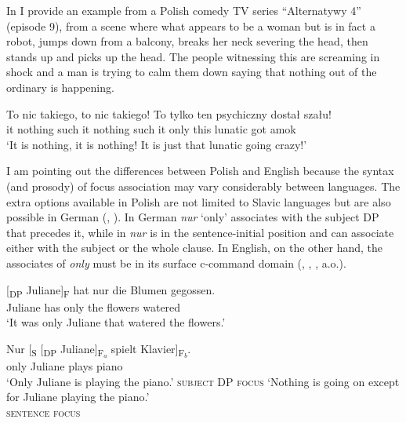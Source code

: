 \documentclass[output=paper,colorlinks,citecolor=brown]{langscibook}
\begin{document}
In  I provide an example from a Polish comedy TV series ``Alternatywy 4'' (episode 9), from a scene where what appears to be a woman but is in fact a robot, jumps down from a balcony, breaks her neck severing the head, then stands up and picks up the head. The people witnessing this are screaming in shock and a man is trying to calm them down saying that nothing out of the ordinary is happening.

\ea\label{ex:tom:20}
\gll To nic       takiego, to nic         takiego! To tylko ten psychiczny dostał szału!\\
 it   nothing such       it nothing such       it   only     this lunatic       got     amok\\
\glt `It is nothing, it is nothing! It is just that lunatic going crazy!’
\z 

\noindent I am pointing out the differences between Polish and English because the syntax (and prosody) of focus association may vary considerably between languages. The extra options available in Polish are not limited to Slavic languages but are also possible in German (\citealt{bueringhartmann01}, \citealt{steindl13,steindl17}). In  German \textit{nur} `only' associates with the subject DP that precedes it, while in  \textit{nur} is in the sentence-initial position and can associate either with the subject or the whole clause. In English, on the other hand, the associates of \textit{only} must be in its surface c-command domain (\citealt{taglicht84}, \citealt{beaverclark08}, \citealt{toosarvandani10}, a.o.).

\ea\label{ex:tom:21}
\gll {}[\textsubscript{DP} {Juliane}]\textsubscript{F}   hat nur     die Blumen gegossen.\\                                           {} Juliane    has only    the flowers watered \\   
\glt `It was only Juliane that watered the flowers.’\hfill \citep[German;][]{steindl17}
\z 

\ea\label{ex:tom:22}
\gll Nur [\textsubscript{S} [\textsubscript{DP} {Juliane}]\textsubscript{F$_a$} spielt Klavier]\textsubscript{F$_b$}.\\                           
only {} {} Juliane plays piano\\
\ea `Only Juliane is playing the piano.’ \hfill \textsc{subject DP focus}
\ex `Nothing is going on except for Juliane playing the piano.’ \\\hfill \textsc{sentence focus} 
\z \hfill\citep[German;][]{steindl13}
\z 
\end{document}
